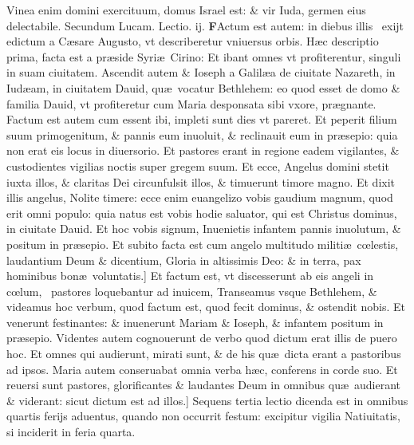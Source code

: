 \documentclass[a5paper,10pt]{book}
\def\rightmarginnote{%
	\lrmarginnote{\hskip\columnwidth \hskip -1em}}
\def\ae{æ}
\def\oe{œ}
\begin{document}
\begin{multicols*}{2}
Vinea enim domini exercituum, domus Israel est: \& vir Iuda, germen eius delectabile.
\newline \color{red} Secundum Lucam. \hfill Lectio. ij.\color{black}
\vspace{-.25em}
\lettrine[lines=2]{\bfseries \color{red} F}{}Actum\rightmarginnote{c.2.a} est autem: in diebus illis \textdagger \ exijt edictum a C\ae sare Augusto, vt describeretur vniuersus orbis.
H\ae c descriptio prima, facta est a pr\ae side Syri\ae \ Cirino: Et ibant omnes vt profiterentur, singuli in suam ciuitatem.
Ascendit autem \& Ioseph a Galil\ae a de ciuitate Nazareth, in Iud\ae am, in ciuitatem Dauid, qu\ae \ vocatur Bethlehem: eo quod esset de domo \& familia Dauid, vt profiteretur cum Maria desponsata sibi vxore, pr\ae gnante.
Factum est autem cum essent ibi, impleti sunt dies vt pareret.
Et peperit filium suum primogenitum, \& pannis eum inuoluit, \& reclinauit eum in pr\ae sepio: quia non erat eis locus in diuersorio. Et pastores erant in regione eadem vigilantes, \& custodientes vigilias noctis super gregem suum.
Et ecce, Angelus domini stetit iuxta illos, \& claritas Dei circunfulsit illos, \& timuerunt timore magno.
Et dixit illis angelus, Nolite timere: ecce enim euangelizo vobis gaudium magnum, quod erit omni populo: quia natus est vobis hodie saluator, qui est Christus dominus, in ciuitate Dauid.
Et hoc vobis signum, Inuenietis infantem pannis inuolutum, \& positum in pr\ae sepio.
Et subito facta est cum angelo multitudo militi\ae \ c\oe lestis, laudantium Deum \& dicentium, Gloria in altissimis Deo: \& in terra, pax hominibus bon\ae \ voluntatis.]
Et factum est, vt discesserunt ab eis angeli in c\oe lum, \textdagger \ pastores\rightmarginnote{B} loquebantur ad inuicem, Transeamus vsque Bethlehem, \& videamus hoc verbum, quod factum est, quod fecit dominus, \& ostendit nobis.
Et venerunt festinantes: \& inuenerunt Mariam \& Ioseph, \& infantem positum in pr\ae sepio.
Videntes autem cognouerunt de verbo quod dictum erat illis de puero hoc.
Et omnes qui audierunt, mirati sunt, \& de his qu\ae \ dicta erant a pastoribus ad ipsos.
Maria autem conseruabat omnia verba h\ae c, conferens in corde suo.
Et reuersi sunt pastores, glorificantes \& laudantes Deum in omnibus qu\ae \ audierant \& viderant: sicut dictum est ad illos.]
\newline {} \color{red} Sequens tertia lectio dicenda est in omnibus quartis ferijs aduentus, quando non occurrit festum: excipitur vigilia Natiuitatis, si inciderit in feria quarta. \color{black}
\fancyhead[C]{\color{red} Feria. iiij. Dominic\ae . j. aduentus}

\end{multicols*}
\end{document}
